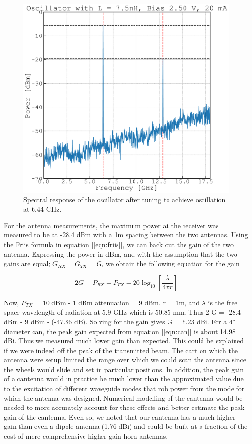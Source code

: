\documentclass{article}
\begin{document}
\begin{figure}[!htbp]
    \centering
    \includegraphics[scale=0.35]{6GHz_plot.pdf}
    \caption{Spectral response of the oscillator after tuning to achieve oscillation at 6.44 GHz.}
    \label{fig:6GHz}
\end{figure}

For the antenna measurements, the maximum power at the receiver was measured to be at -28.4 dBm with a 1m spacing between the two antennas. Using the Friis formula in equation [\ref{eqn:friis}], we can back out the gain of the two antenna. Expressing the power in dBm, and with the assumption that the two gains are equal; $G_{RX} = G_{TX} = G$, we obtain the following equation for the gain

\begin{equation}
    2 G = P_{RX} - P_{TX} - 20 \log_{10} \left[\frac{\lambda}{4 \pi r}\right]
\end{equation}

Now, $P_{TX}$ = 10 dBm - 1 dBm attenuation = 9 dBm. r = 1m, and $\lambda$ is the free space wavelength of radiation at 5.9 GHz which is 50.85 mm. Thus 2 G = -28.4 dBm - 9 dBm - (-47.86 dB). Solving for the gain gives G = 5.23 dBi. For a 4" diameter can, the peak gain expected from equation [\ref{eqn:can}] is about 14.98 dBi. Thus we measured much lower gain than expected. This could be explained if we were indeed off the peak of the transmitted beam. The cart on which the antenna were setup limited the range over which we could scan the antenna since the wheels would slide and set in particular positions. In addition, the peak gain of a cantenna would in practice be much lower than the approximated value due to the excitation of different waveguide modes that rob power from the mode for which the antenna was designed. Numerical modelling of the cantenna would be needed to more accurately account for these effects and better estimate the peak gain of the cantenna. Even so, we noted that our cantenna has a much higher gain than even a dipole antenna (1.76 dBi) and could be built at a fraction of the cost of more comprehensive higher gain horn antennas.  
\end{document}
